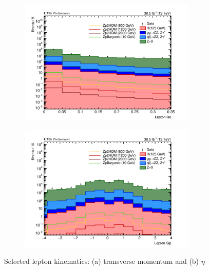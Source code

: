 \begin{figure}[tbh]
\begin{subfigure}{0.50\textwidth}
\centering
\includegraphics[width=3.3in]{figures/hist_hIsoLep_3.png}
\caption{}
\end{subfigure}
\begin{subfigure}{0.50\textwidth}
\centering
\includegraphics[width=3.3in]{figures/hist_hSipLep_3.png}
\caption{}
\end{subfigure}
\caption{Selected lepton kinematics: (a) transverse momentum and (b) $\eta$}
\label{fig:lepkin2}
\end{figure}

 

